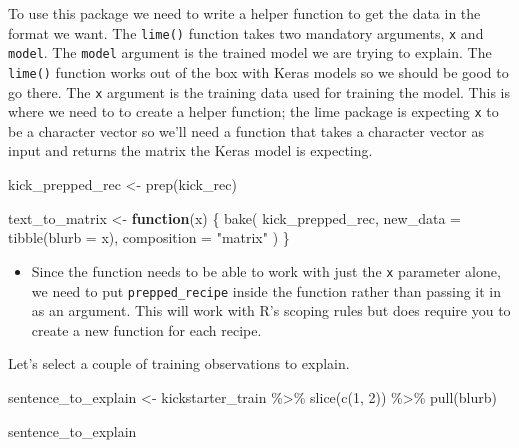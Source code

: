 \documentclass[
]{krantz}
\makeatletter
\newenvironment{Shaded}{\begin{snugshade}}{\end{snugshade}}
\newcommand{\AttributeTok}[1]{\textcolor[rgb]{0.77,0.63,0.00}{#1}}
\newcommand{\ControlFlowTok}[1]{\textcolor[rgb]{0.13,0.29,0.53}{\textbf{#1}}}
\newcommand{\DecValTok}[1]{\textcolor[rgb]{0.00,0.00,0.81}{#1}}
\newcommand{\FunctionTok}[1]{\textcolor[rgb]{0.00,0.00,0.00}{#1}}
\newcommand{\NormalTok}[1]{#1}
\newcommand{\OtherTok}[1]{\textcolor[rgb]{0.56,0.35,0.01}{#1}}
\newcommand{\SpecialCharTok}[1]{\textcolor[rgb]{0.00,0.00,0.00}{#1}}
\newcommand{\StringTok}[1]{\textcolor[rgb]{0.31,0.60,0.02}{#1}}
\newenvironment{kframe}{%
\medskip{}
\setlength{\fboxsep}{.8em}
 \def\at@end@of@kframe{}%
 \ifinner\ifhmode%
  \def\at@end@of@kframe{\end{minipage}}%
  \begin{minipage}{\columnwidth}%
 \fi\fi%
 \def\FrameCommand##1{\hskip\@totalleftmargin \hskip-\fboxsep
 \colorbox{shadecolor}{##1}\hskip-\fboxsep
     \hskip-\linewidth \hskip-\@totalleftmargin \hskip\columnwidth}%
 \MakeFramed {\advance\hsize-\width
   \@totalleftmargin\z@ \linewidth\hsize
   \@setminipage}}%
 {\par\unskip\endMakeFramed%
 \at@end@of@kframe}
\renewenvironment{Shaded}{\begin{kframe}}{\end{kframe}}
\newenvironment{rmdblock}[1]
  {\begin{shaded*}
  \begin{itemize}[left = -1cm, labelsep = 1cm]
  \renewcommand{\labelitemi}{
    \raisebox{-.7\height}[0pt][0pt]{
      {\setkeys{Gin}{width=3em,keepaspectratio}\texttt{[image: images/\#1]}}
    }
  }
 
  \item
  }
  {
  \end{itemize}
  \end{shaded*}
  }
\newenvironment{rmdnote}
  {\begin{rmdblock}{note}}
  {\end{rmdblock}}
\makeatother
\begin{document}
To use this package we need to write a helper function to get the data in the format we want. The \texttt{lime()} function takes two mandatory arguments, \texttt{x} and \texttt{model}. The \texttt{model} argument is the trained model we are trying to explain. The \texttt{lime()} function works out of the box with Keras models so we should be good to go there. The \texttt{x} argument is the training data used for training the model. This is where we need to to create a helper function; the lime package is expecting \texttt{x} to be a character vector so we'll need a function that takes a character vector as input and returns the matrix the Keras model is expecting.

\begin{Shaded}
\begin{Highlighting}[]
\NormalTok{kick\_prepped\_rec }\OtherTok{\textless{}{-}} \FunctionTok{prep}\NormalTok{(kick\_rec)}

\NormalTok{text\_to\_matrix }\OtherTok{\textless{}{-}} \ControlFlowTok{function}\NormalTok{(x) \{}
  \FunctionTok{bake}\NormalTok{(}
\NormalTok{    kick\_prepped\_rec,}
    \AttributeTok{new\_data =} \FunctionTok{tibble}\NormalTok{(}\AttributeTok{blurb =}\NormalTok{ x),}
    \AttributeTok{composition =} \StringTok{"matrix"}
\NormalTok{  )}
\NormalTok{\}}
\end{Highlighting}
\end{Shaded}

\begin{rmdnote}
Since the function needs to be able to work with just the \texttt{x}
parameter alone, we need to put \texttt{prepped\_recipe} inside the
function rather than passing it in as an argument. This will work with
R's scoping rules but does require you to create a new function for each
recipe.
\end{rmdnote}

Let's select a couple of training observations to explain.

\begin{Shaded}
\begin{Highlighting}[]
\NormalTok{sentence\_to\_explain }\OtherTok{\textless{}{-}}\NormalTok{ kickstarter\_train }\SpecialCharTok{\%\textgreater{}\%}
  \FunctionTok{slice}\NormalTok{(}\FunctionTok{c}\NormalTok{(}\DecValTok{1}\NormalTok{, }\DecValTok{2}\NormalTok{)) }\SpecialCharTok{\%\textgreater{}\%}
  \FunctionTok{pull}\NormalTok{(blurb)}

\NormalTok{sentence\_to\_explain}
\end{Highlighting}
\end{Shaded}
\end{document}
